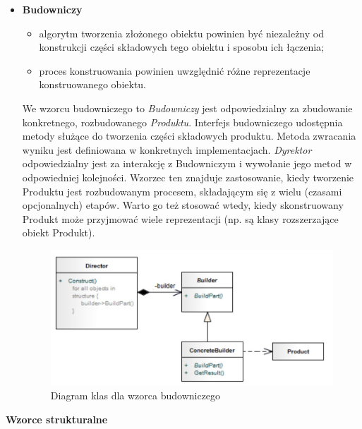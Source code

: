 \documentclass[a4paper,12pt,oneside]{book}
\begin{document}
\begin{itemize}
                    \item \textbf{Budowniczy}
                    \begin{itemize}
                        \item algorytm tworzenia złożonego obiektu powinien być niezależny od 
                        konstrukcji części składowych tego obiektu i sposobu ich łączenia;
                        \item proces konstruowania powinien uwzględnić różne reprezentacje 
                        konstruowanego obiektu.
                    \end{itemize}
                    We wzorcu budowniczego to \textit{Budowniczy} jest odpowiedzialny za zbudowanie konkretnego, rozbudowanego \textit{Produktu}. Interfejs budowniczego udostępnia metody służące do tworzenia części składowych produktu. Metoda zwracania wyniku jest definiowana w konkretnych implementacjach. \textit{Dyrektor} odpowiedzialny jest za interakcję z Budowniczym i wywołanie jego metod w odpowiedniej kolejności. Wzorzec ten znajduje zastosowanie, kiedy tworzenie Produktu jest rozbudowanym procesem, składającym się z wielu (czasami opcjonalnych) etapów. Warto go też stosować wtedy, kiedy skonstruowany Produkt może przyjmować wiele reprezentacji (np. są klasy rozszerzające obiekt Produkt).
                    \begin{figure}[h]
                        \centering
                        \includegraphics[width=\textwidth/2]{images/bob.jpg}
                        \caption{Diagram klas dla wzorca budowniczego}
                        \label{fig:twojastara9}
                    \end{figure}
                \end{itemize}
                \textbf{Wzorce strukturalne}
\end{document}
